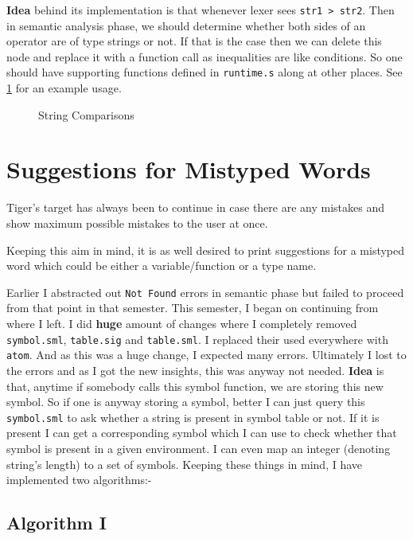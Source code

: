 \textbf{Idea} behind its implementation is that whenever lexer sees \texttt{str1 > str2}. Then in semantic analysis phase, we should determine whether both sides of an operator are of type strings or not. If that is the case then we can delete this node and replace it with a function call as inequalities are like conditions. So one should have supporting functions defined in \texttt{runtime.s} along at other places. See \ref{fig:sc} for an example usage.

\begin{figure}
	\centering
	\caption{String Comparisons}
	\label{fig:sc}
\end{figure}

\section{Suggestions for Mistyped Words}

Tiger's target has always been to continue in case there are any mistakes and show maximum possible mistakes to the user at once.

Keeping this aim in mind, it is as well desired to print suggestions for a mistyped word which could be either a variable/function or a type name.

Earlier I abstracted out \texttt{Not Found} errors in semantic phase but failed to proceed from that point in that semester. This semester, I began on continuing from where I left. I did \textbf{huge} amount of changes where I completely removed \texttt{symbol.sml}, \texttt{table.sig} and \texttt{table.sml}. I replaced their used everywhere with \texttt{atom}. And as this was a huge change, I expected many errors. Ultimately I lost to the errors and as I got the new insights, this was anyway not needed. \textbf{Idea} is that, anytime if somebody calls this symbol function, we are storing this new symbol. So if one is anyway storing a symbol, better I can just query this \texttt{symbol.sml} to ask whether a string is present in symbol table or not. If it is present I can get a corresponding symbol which I can use to check whether that symbol is present in a given environment. I can even map an integer (denoting string's length) to a set of symbols. Keeping these things in mind, I have implemented two algorithms:-

\subsection{Algorithm I}

